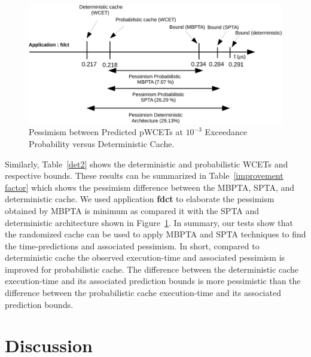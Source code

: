 \begin{figure}[tb!]

  
   
   \includegraphics[scale=0.8]{figures/tpc-example2.pdf}

\caption{Pessimism between Predicted pWCETs at $10^{-3}$ Exceedance Probability versus Deterministic Cache.} 
\label{application:fdct}
\end{figure}
Similarly, Table~\ref{det2} shows the deterministic and probabilistic WCETs and respective bounds. These results can be summarized in 
Table~\ref{improvement factor} which shows the pessimism difference between the MBPTA, SPTA, and deterministic cache.  We used application \textbf{fdct} to elaborate the pessimism obtained by MBPTA is minimum as compared it with the SPTA and deterministic architecture shown in Figure~\ref{application:fdct}.  In summary, our tests show that the randomized cache can be used to apply MBPTA and SPTA techniques to find the time-predictions and associated pessimism.
In short, compared to deterministic cache the observed execution-time and associated pessimism is improved
 for probabilistic cache. The difference between the deterministic cache execution-time and its associated prediction bounds is more pessimistic than the difference between the probabilistic cache execution-time and its associated prediction bounds. 
 


\section{Discussion}

